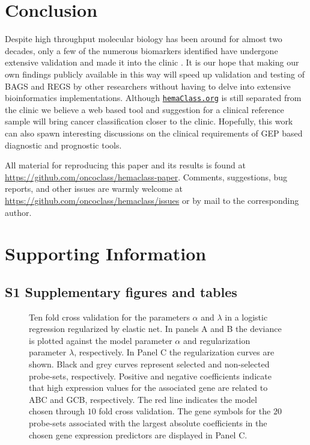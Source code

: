 \documentclass[10pt,letterpaper]{article}
\newcommand{\hemaClass}{\href{http://hemaClass.org}{\texttt{hemaClass.org}}}
\begin{document}
\section*{Conclusion}
Despite high throughput molecular biology has been around for almost two decades, only a few of the numerous biomarkers identified have undergone extensive validation and made it into the clinic \cite{Chen2012a}.
It is our hope that making our own findings publicly available in this way will speed up validation and testing of BAGS and REGS by other researchers without having to delve into extensive bioinformatics implementations.
Although \hemaClass{} is still separated from the clinic we believe a web based tool and suggestion for a clinical reference sample will bring cancer classification closer to the clinic.
Hopefully, this work can also spawn interesting discussions on the clinical requirements of GEP based diagnostic and prognostic tools.

All material for reproducing this paper and its results is found at \url{https://github.com/oncoclass/hemaclass-paper}.
Comments, suggestions, bug reports, and other issues are warmly welcome at \url{https://github.com/oncoclass/hemaclass/issues} or by mail to the corresponding author.

\section*{Supporting Information}

\setcounter{equation}{0}
\setcounter{figure}{0}
\setcounter{table}{0}

\renewcommand{\theequation}{S\arabic{equation}}
\renewcommand{\thefigure}{S\arabic{figure}}
\renewcommand{\thetable}{S\arabic{table}}
\renewcommand{\thesection}{S\arabic{section}}

\subsection*{S1 Supplementary figures and tables}

\begin{figure}[!ht]
\caption{Ten fold cross validation for the parameters $\alpha$ and $\lambda$ in a logistic regression regularized by elastic net.
In panels A and B the deviance is plotted against the model parameter $\alpha$ and regularization parameter $\lambda$, respectively.
In Panel C the regularization curves are shown.
Black and grey curves represent selected and non-selected probe-sets, respectively.
Positive and negative coefficients indicate that high expression values for the associated gene are related to ABC and GCB, respectively.
The red line indicates the model chosen through $10$ fold cross validation.
The gene symbols for the $20$ probe-sets associated with the largest absolute coefficients in the chosen gene expression predictors are displayed in Panel C.}
\label{fig:crossval}
\end{figure}
\end{document}
